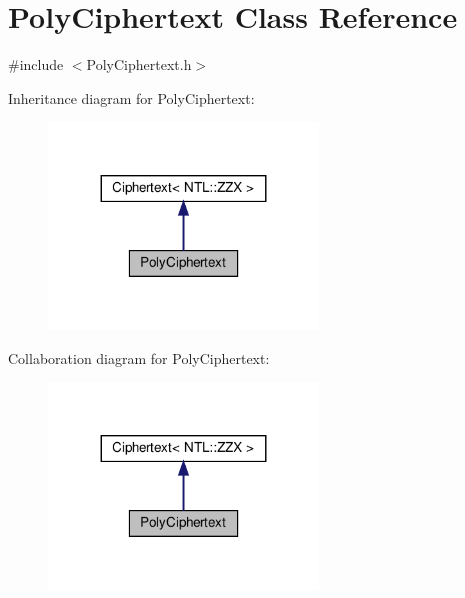 \hypertarget{classPolyCiphertext}{}\section{Poly\+Ciphertext Class Reference}
\label{classPolyCiphertext}


{\ttfamily \#include $<$Poly\+Ciphertext.\+h$>$}



Inheritance diagram for Poly\+Ciphertext\+:
\nopagebreak
\begin{figure}[H]
\begin{center}
\leavevmode
\includegraphics[width=203pt]{classPolyCiphertext__inherit__graph}
\end{center}
\end{figure}


Collaboration diagram for Poly\+Ciphertext\+:
\nopagebreak
\begin{figure}[H]
\begin{center}
\leavevmode
\includegraphics[width=203pt]{classPolyCiphertext__coll__graph}
\end{center}
\end{figure}
